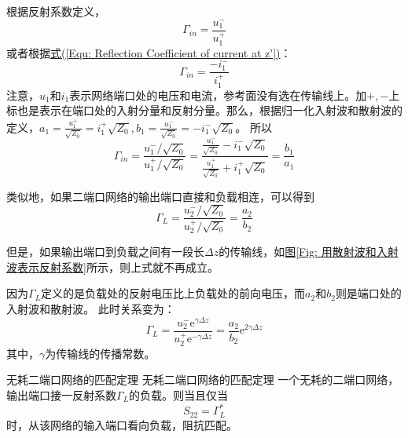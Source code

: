 \begin{tcbproof}
        根据反射系数定义，
        \begin{equation}
            \varGamma_{in}=\frac{u_1^-}{u_1^+}
        \end{equation}
        或者根据\hyperref[Equ: Reflection Coefficient of current at z']{式(\ref*{Equ: Reflection Coefficient of current at z'})}：
        \begin{equation}
            \varGamma_{in}=\frac{-i_1^-}{i_1^+}
        \end{equation}
        注意，$u_1$和$i_1$表示网络端口处的电压和电流，参考面没有选在传输线上。加$+,-$上标也是表示在端口处的入射分量和反射分量。那么，根据归一化入射波和散射波的定义，$a_1=\frac{u_1^+}{\sqrt{Z_0}}={i_1^+}{\sqrt{Z_0}},b_1=\frac{u_1^-}{\sqrt{Z_0}}=-{i_1^-}{\sqrt{Z_0}}$。
        所以
        \begin{equation}
            \varGamma_{in}
            =\frac{u_1^-/\sqrt{Z_0}}{u_1^+/\sqrt{Z_0}}
            =\frac{\frac{u_1^-}{\sqrt{Z_0}}-i_1^-\sqrt{Z_0}}{\frac{u_1^+}{\sqrt{Z_0}}+i_1^+\sqrt{Z_0}}
            =\frac{b_1}{a_1}
        \end{equation}

        类似地，如果二端口网络的输出端口直接和负载相连，可以得到
        \begin{equation}
            \varGamma_L
            =\frac{u_2^-/\sqrt{Z_0}}{u_2^+/\sqrt{Z_0}}
            =\frac{a_2}{b_2}
        \end{equation}

        但是，如果输出端口到负载之间有一段长$\Delta z$的传输线，如\hyperref[Fig: 用散射波和入射波表示反射系数]{图\ref*{Fig: 用散射波和入射波表示反射系数}}所示，则上式就不再成立。

        因为$\varGamma_L$定义的是负载处的反射电压比上负载处的前向电压，而$a_2$和$b_2$则是端口处的入射波和散射波。
        此时关系变为：
        \begin{equation}
            \varGamma_L
            =\frac{u_2^-\mathrm{e}^{\gamma \Delta z}}{u_2^+\mathrm{e}^{-\gamma \Delta z}}
            =\frac{a_2}{b_2}\mathrm{e}^{2\gamma \Delta z}
        \end{equation}
        其中，$\gamma$为传输线的传播常数。
    \end{tcbproof}

    \begin{corollary}
    {无耗二端口网络的匹配定理}
    {无耗二端口网络的匹配定理}
        一个无耗的二端口网络，输出端口接一反射系数$\varGamma_L$的负载。则当且仅当
        \begin{equation}
            S_{22}=\varGamma_L^*
        \end{equation}
        时，从该网络的输入端口看向负载，阻抗匹配。
    \end{corollary}

